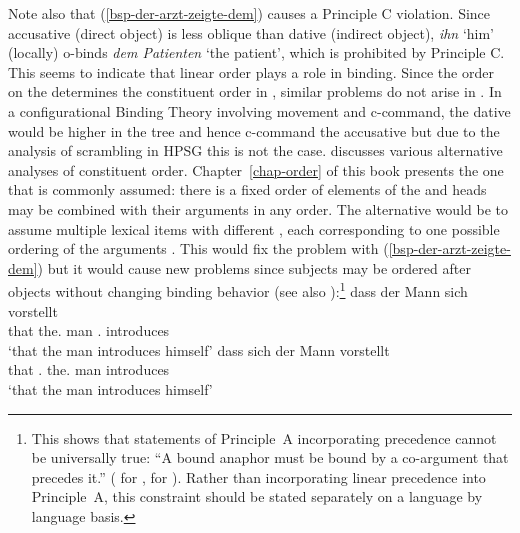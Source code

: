 \documentclass[output=paper
	        ,collection
	        ,collectionchapter
 	        ,biblatex
                ,babelshorthands
                ,newtxmath
                ,draftmode
                ,colorlinks, citecolor=brown
]{langscibook}
\begin{document}
{Note also that (\ref{bsp-der-arzt-zeigte-dem}) causes a Principle C violation. Since accusative
(direct object) is less oblique than dative (indirect object), \emph{ihn} `him' (locally) o-binds \emph{dem
  Patienten} `the patient', which is prohibited by Principle C. This seems to indicate that linear
order plays a role in binding. Since the order on the \argstl determines the constituent order in
, similar problems do not arise in . In a configurational Binding Theory involving
movement and c-command, the dative would be higher in the tree and hence c-command the accusative
but due to the analysis of scrambling in HPSG  this is not the
case. \citet{Mueller2004b} discusses various alternative analyses of constituent
order. Chapter~\ref{chap-order} of this book presents the one that is commonly assumed: there is a
fixed order of elements of the \argstl and heads may be combined with their arguments in any
order. The alternative would be to assume multiple lexical items with different \argstls, each
corresponding to one possible ordering of the arguments \citep{Uszkoreit86b}. This would fix the problem with
(\ref{bsp-der-arzt-zeigte-dem}) but it would cause new problems since subjects may be ordered after
objects without changing binding behavior (see also \citealp[]{Riezler95a}):\footnote{%
  This shows that statements of Principle~A incorporating precedence cannot be universally true: ``A
  bound anaphor must be bound by a co-argument that precedes it.'' (\citealp[Section~9]{ArkaWechsler96a-u} for
  , \citealp[]{AMM2017a-u} for ).
Rather than incorporating linear precedence into
  Principle~A, this constraint should be stated separately on a language by language basis.%
}
\eal
\ex
\gll dass der Mann sich vorstellt\\
     that the.\nom{} man  \self.\acc{} introduces\\
\glt `that the man introduces himself'
\ex
\gll dass sich der Mann vorstellt\\
     that \self.\acc{} the.\nom{} man  introduces\\
\glt `that the man introduces himself'
\zl
}
\end{document}
